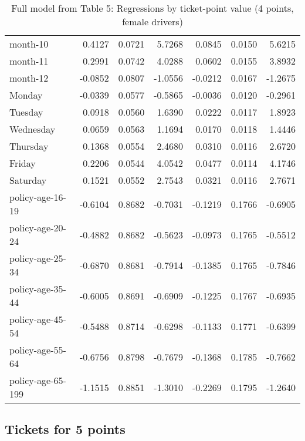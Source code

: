 \documentclass[10pt]{article}
\begin{document}
\begin{table}[ht]
\begin{tabular}{lrrrrrr}
  month-10 & 0.4127 & 0.0721 & 5.7268 & 0.0845 & 0.0150 & 5.6215 \\ 
  month-11 & 0.2991 & 0.0742 & 4.0288 & 0.0602 & 0.0155 & 3.8932 \\ 
  month-12 & -0.0852 & 0.0807 & -1.0556 & -0.0212 & 0.0167 & -1.2675 \\ 
  Monday & -0.0339 & 0.0577 & -0.5865 & -0.0036 & 0.0120 & -0.2961 \\ 
  Tuesday & 0.0918 & 0.0560 & 1.6390 & 0.0222 & 0.0117 & 1.8923 \\ 
  Wednesday & 0.0659 & 0.0563 & 1.1694 & 0.0170 & 0.0118 & 1.4446 \\ 
  Thursday & 0.1368 & 0.0554 & 2.4680 & 0.0310 & 0.0116 & 2.6720 \\ 
  Friday & 0.2206 & 0.0544 & 4.0542 & 0.0477 & 0.0114 & 4.1746 \\ 
  Saturday & 0.1521 & 0.0552 & 2.7543 & 0.0321 & 0.0116 & 2.7671 \\ 
  policy-age-16-19 & -0.6104 & 0.8682 & -0.7031 & -0.1219 & 0.1766 & -0.6905 \\ 
  policy-age-20-24 & -0.4882 & 0.8682 & -0.5623 & -0.0973 & 0.1765 & -0.5512 \\ 
  policy-age-25-34 & -0.6870 & 0.8681 & -0.7914 & -0.1385 & 0.1765 & -0.7846 \\ 
  policy-age-35-44 & -0.6005 & 0.8691 & -0.6909 & -0.1225 & 0.1767 & -0.6935 \\ 
  policy-age-45-54 & -0.5488 & 0.8714 & -0.6298 & -0.1133 & 0.1771 & -0.6399 \\ 
  policy-age-55-64 & -0.6756 & 0.8798 & -0.7679 & -0.1368 & 0.1785 & -0.7662 \\ 
  policy-age-65-199 & -1.1515 & 0.8851 & -1.3010 & -0.2269 & 0.1795 & -1.2640 \\ 
   \hline
\end{tabular}
\caption{Full model from Table 5: Regressions by ticket-point value (4 points, female drivers)} 
\label{tab_5_4_pts_F}
\end{table}


\clearpage
\pagebreak




\subsection{Tickets for 5 points}



\end{document}
